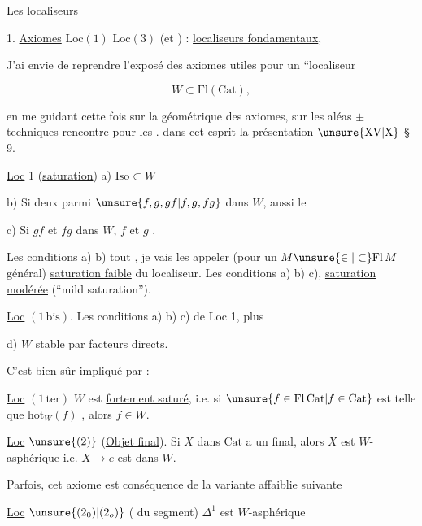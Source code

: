 
Les localiseurs 

1. \uline{Axiomes} $\mathrm{Loc}(1)$  $\mathrm{Loc}(3)$ (et ) : \uline{localiseurs fondamentaux},

J'ai envie de reprendre l'exposé des axiomes
utiles pour un ``localiseur 

\[
W\subset\mathrm{Fl}(\mathrm{Cat}),
\]

en me guidant cette fois  sur la 
géométrique des axiomes,  sur les
aléas $\pm$ techniques  rencontre  pour les .  
dans cet esprit la présentation  $\unsure{\mathrm{XV}|\mathrm{X}}$ § 9.

\uline{Loc} 1 (\uline{saturation}) \quad a) $\mathrm{Iso}\subset W$

b) Si deux parmi $\unsure{f,g,gf|f,g,fg}$ dans $W$, aussi le 

c) Si $gf$ et $fg$  dans $W$, $f$ et $g$ .

Les conditions a)  b) tout , je vais les appeler
(pour un $M\unsure{\in|\subset}\mathrm{Fl}\,M$ général) \uline{saturation faible} du
localiseur. Les conditions a) b) c), \uline{saturation modérée}
(``mild saturation''). 

\uline{Loc} $(1\,\mathrm{bis})$. Les conditions a) b) c) de Loc 1, plus

d) $W$ stable par facteurs directs.

C'est bien sûr impliqué par :

\uline{Loc} $(1\,\mathrm{ter})$ $W$ est \uline{fortement saturé}, i.e. si $\unsure{f\in\mathrm{Fl}\,\mathrm{Cat}|f\in\mathrm{Cat}}$ est
telle que $\mathrm{hot}_{W}(f)$ , alors $f\in W$.

 \uline{Loc} $\unsure{(2)}$ (\uline{Objet final}). Si $X$ dans $\mathrm{Cat}$ a un  final,
alors $X$ est $W$-asphérique i.e. $X\longrightarrow e$ est dans $W$.

Parfois, cet axiome est conséquence de la variante
affaiblie suivante

\uline{Loc} $\unsure{(2_0)|(2_o)}$ ( du segment) $\Delta^1$ est $W$-asphérique
